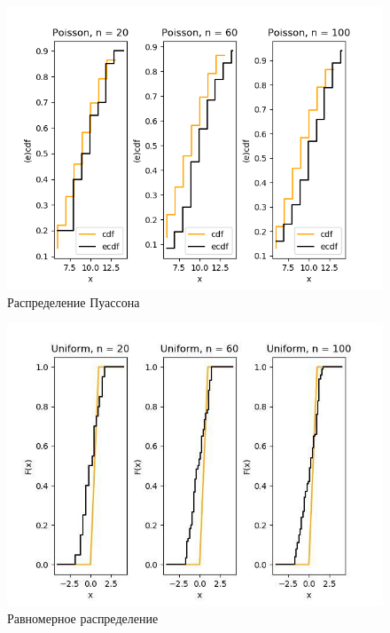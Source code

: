 \documentclass[../body.tex]{subfiles}
\begin{document}
\begin{figure}[H]
	\centering
	\includegraphics[width=\textwidth, height =0.4\textheight]{img/PoissonCDF.png}
	\caption{Распределение Пуассона}
	\label{fig:poisson_cdf}
\end{figure}


\begin{figure}[H]
	\centering
	\includegraphics[width=\textwidth, height =0.4\textheight]{img/UniformCDF.png}
	\caption{Равномерное распределение}
	\label{fig:uniform_cdf}
\end{figure}
\end{document}

